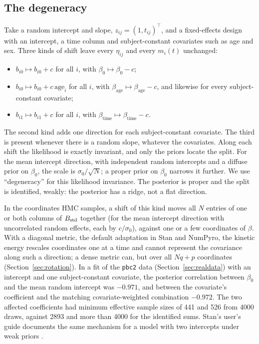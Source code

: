 \subsection{The degeneracy}\label{sec:degeneracy}

Take a random intercept and slope, $z_{ij} = (1, t_{ij})^{\top}$, and a
fixed-effects design with an intercept, a time column and subject-constant
covariates such as age and sex. Three kinds of shift leave every
$\eta_{ij}$ and every $m_i(t)$ unchanged:
\begin{itemize}
\item $b_{i0} \mapsto b_{i0} + c$ for all $i$, with $\beta_0 \mapsto
\beta_0 - c$;
\item $b_{i0} \mapsto b_{i0} + c\,\mathrm{age}_i$ for all $i$, with
$\beta_{\mathrm{age}} \mapsto \beta_{\mathrm{age}} - c$, and likewise for
every subject-constant covariate;
\item $b_{i1} \mapsto b_{i1} + c$ for all $i$, with $\beta_{\mathrm{time}}
\mapsto \beta_{\mathrm{time}} - c$.
\end{itemize}
The second kind adds one direction for each subject-constant covariate.
The third is present whenever there is a random slope, whatever the
covariates.
Along each shift the likelihood is exactly invariant, and only the priors
locate the split. For the mean intercept direction, with independent
random intercepts and a diffuse prior on $\beta_0$, the scale is
$\sigma_0/\sqrt{N}$; a proper prior on $\beta_0$ narrows it further. We use
``degeneracy'' for this likelihood invariance. The posterior is proper and
the split is identified, weakly: the posterior has a ridge, not a flat
direction.

In the coordinates HMC samples, a shift of this kind moves all $N$
entries of one or both columns of $B_{\mathrm{std}}$ together (for the mean intercept
direction with uncorrelated random effects, each by $c/\sigma_0$), against
one or a few coordinates of $\beta$. With a diagonal metric, the default
adaptation in Stan and NumPyro, the kinetic energy rescales coordinates one
at a time and cannot represent the covariance along such a direction;
a dense metric can, but over all $Nq + p$ coordinates
(Section~\ref{sec:rotation}). In a fit of the \texttt{pbc2} data
(Section~\ref{sec:realdata}) with an intercept and one subject-constant
covariate, the posterior correlation between $\beta_0$ and the mean random
intercept was $-0.971$, and between the covariate's coefficient and the
matching covariate-weighted combination $-0.972$. The two affected
coefficients had minimum
effective sample sizes of 441 and 526 from 4000 draws, against 2893 and
more than 4000 for the identified sums. Stan's user's guide documents the
same mechanism for a model with two intercepts under weak priors
\citep{stanug}.

